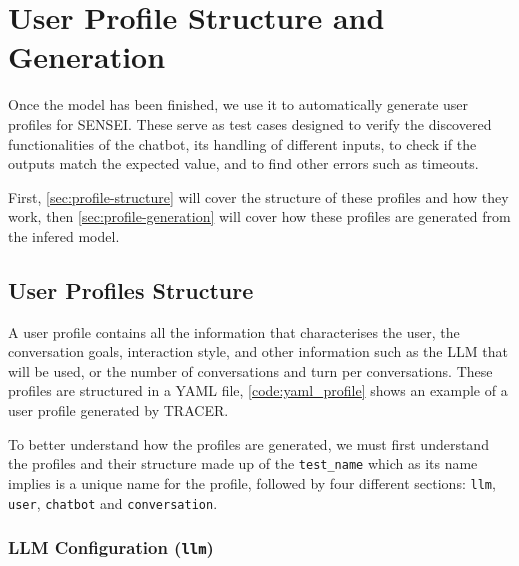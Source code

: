 
\chapter{User Profile Structure and Generation}\label{chapter:user_profiles}

Once the model has been finished,
we use it to automatically generate user profiles for SENSEI.
These serve as test cases designed to verify
the discovered functionalities of the chatbot,
its handling of different inputs,
to check if the outputs match the expected value,
and to find other errors such as timeouts.

First, \autoref{sec:profile-structure}
will cover the structure of these profiles and how they work,
then \autoref{sec:profile-generation}
will cover how these profiles are generated from the infered model.


\section{User Profiles Structure}\label{sec:profile-structure}

A user profile contains all the information
that characterises the user,
the conversation goals,
interaction style,
and other information such as the \ac{LLM} that will be used,
or the number of conversations and turn per conversations.
These profiles are structured in a YAML file,
\autoref{code:yaml_profile} shows an example of a user profile generated by \ac{TRACER}.

\begin{figure}[htpb]
  \centering
  
\end{figure}

To better understand how the profiles are generated,
we must first understand the profiles and their structure
made up of the \texttt{test\_name}
which as its name implies is a unique name for the profile,
followed by four different sections:
\texttt{llm}, \texttt{user}, \texttt{chatbot} and \texttt{conversation}.

\subsection{LLM Configuration (\texttt{llm})}

